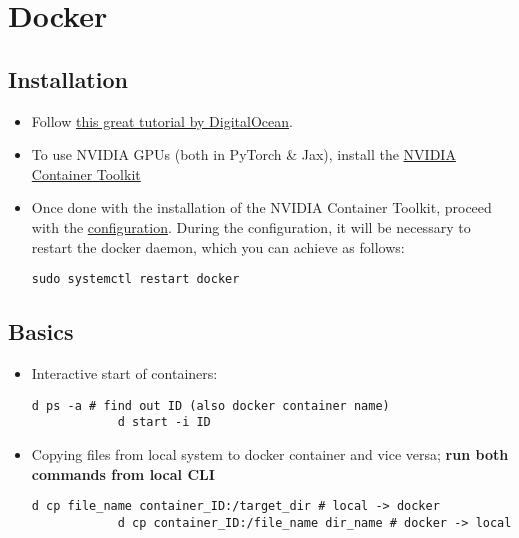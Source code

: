 \documentclass[12pt, a4paper]{scrbook}
\numberwithin{equation}{section}
\theoremstyle{definition}
\theoremstyle{definition}
\begin{document}
	\chapter{Docker}
	
	\section{Installation}
	
	\begin{itemize}
		\item Follow  \href{https://www.digitalocean.com/community/tutorials/how-to-install-and-use-docker-on-ubuntu-20-04}{this great tutorial by DigitalOcean}.
		
		\item To use NVIDIA GPUs (both in PyTorch \& Jax), install the \href{https://docs.nvidia.com/datacenter/cloud-native/container-toolkit/latest/install-guide.html#installing-with-apt}{NVIDIA Container Toolkit}
		
		\item Once done with the installation of the NVIDIA Container Toolkit, proceed with the \href{https://docs.nvidia.com/datacenter/cloud-native/container-toolkit/latest/install-guide.html#configuring-docker}{configuration}. During the configuration, it will be necessary to restart the docker daemon, which you can achieve as follows: 
		
		\begin{lstlisting}[style=mystylebash, label=alg:docker_restart, xleftmargin=\parindent]
			sudo systemctl restart docker
		\end{lstlisting}
		
	\end{itemize}
	
	\section{Basics}
	
	\begin{itemize} 
		\item Interactive start of containers: 
		
		\begin{lstlisting}[style=mystylebash, label=alg:docker_id, xleftmargin=\parindent]
			d ps -a # find out ID (also docker container name)
			d start -i ID
		\end{lstlisting}
		
		\item Copying files from local system to docker container and vice versa; \textbf{run both commands from local CLI}
		
		\begin{lstlisting}[style=mystylebash, label=alg:docker_cp, xleftmargin=\parindent]
			d cp file_name container_ID:/target_dir # local -> docker
			d cp container_ID:/file_name dir_name # docker -> local
		\end{lstlisting}
	\end{itemize}
	
\end{document}
